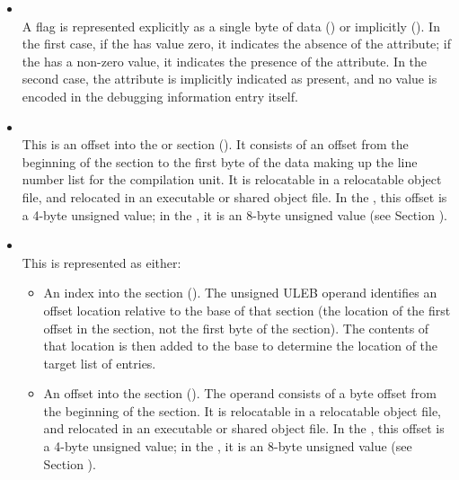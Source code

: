 \begin{itemize}
\item \CLASSflag \\
A flag 
is represented explicitly as a single byte of data
(\DWFORMflagTARG) or implicitly (\DWFORMflagpresentTARG). In the
first case, if the  has value zero, it indicates the
absence of the attribute; if the  has a non-zero value,
it indicates the presence of the attribute. In the second
case, the attribute is implicitly indicated as present, and
no value is encoded in the debugging information entry itself.

\item \CLASSlineptr \\
This is an offset into 
the 
\dotdebugline{} or \dotdebuglinedwo{} section
(\DWFORMsecoffset).
It consists of an offset from the beginning of the 
\dotdebugline{}
section to the first byte of
the data making up the line number list for the compilation
unit. 
It is relocatable in a relocatable object file, and
relocated in an executable or shared object file. In the 
\thirtytwobitdwarfformat, this offset is a 4-byte unsigned value;
in the \sixtyfourbitdwarfformat, it is an 8-byte unsigned value
(see Section ).

\item \CLASSloclist \\
This is represented as either:
\begin{itemize}
\item
An index into the \dotdebugloclists{} section (\DWFORMloclistxTARG). 
The unsigned ULEB operand identifies an offset location 
relative to the base of that section (the location of the first offset 
in the section, not the first byte of the section). The contents of 
that location is then added to the base to determine the location of 
the target list of entries.
\item
An offset into the \dotdebugloclists{} section (\DWFORMsecoffset). 
The operand consists of a byte 
offset
from the beginning of the \dotdebugloclists{} section.
It is relocatable in a relocatable object file, and
relocated in an executable or shared object file. In the 
\thirtytwobitdwarfformat, this offset is a 4-byte unsigned value;
in the \sixtyfourbitdwarfformat, it is an 8-byte unsigned value
(see Section ).
\end{itemize}


\end{itemize}
